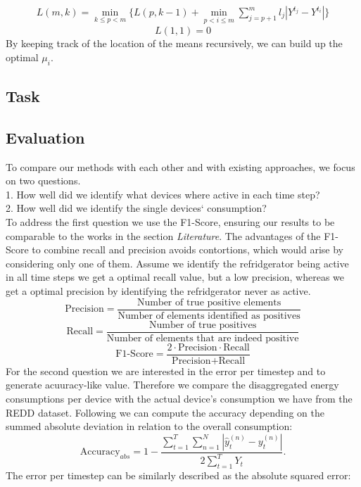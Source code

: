 \documentclass{article}
\begin{document}
%
\begin{align*}
    L(m,k) = \min_{k \leq p < m} \bigg\{ L(p,k-1) + \min_{p < i \leq m} \sum_{j = p+1}^m l_j |Y^{t_j} - Y^{t_i}| \bigg\}
\end{align*}
%
\[ L(1,1) = 0 \]
%
By keeping track of the location of the means recursively, we can build up the optimal $\mu_i$.

\subsection{Task}



\subsection{Evaluation}
To compare our methods with each other and with existing approaches, we focus on two questions.\\
1. How well did we identify what devices where active in each time step?\\
2. How well did we identify the single devices‘ consumption?\\
To address the first question we use the F1-Score, ensuring our results to be comparable to the works in the section \textit{Literature}. The 
advantages of the F1-Score to combine recall and precision avoids contortions, which would arise by considering only one of them. Assume we 
identify the refridgerator being active in all time steps we get a optimal recall value, but a low precision, whereas we get a optimal precision 
by identifying the refridgerator never as active.
\[ \textrm{Precision} = \frac{\textrm{Number of true positive elements}}{\textrm{Number of elements identified as positives}}  \]
\[ \textrm{Recall} = \frac{\textrm{Number of true positives}}{\textrm{Number of elements that are indeed positive}}  \]
\[ \textrm{F1-Score} = \frac{2 \cdot \textrm{Precision} \cdot \textrm{Recall}}{\textrm{Precision} + \textrm{Recall}}\]
For the second question we are interested in the error per timestep and to generate acuuracy-like value. Therefore we
compare the disaggregated energy consumptions per device with the actual device's consumption we have from the REDD
dataset. Following \cite{Redd} we can compute the accuracy depending on the summed absolute deviation in relation to 
the overall consumption:
\[\textrm{Accuracy}_{abs} = 1- \frac{\sum^{T}_{t=1}\sum^{N}_{n=1}|\hat{y}^{(n)}_t-y^{(n)}_t|}{2 \sum^{T}_{t=1}Y_t} .  \]
The error per timestep can be similarly described as the absolute squared error:
\end{document}
